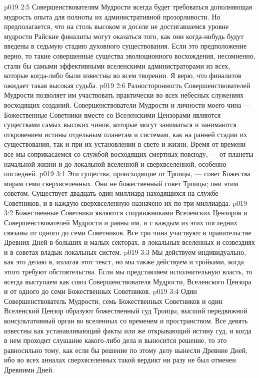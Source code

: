 \vs p019 2:5 Совершенствователям Мудрости всегда будет требоваться дополняющая мудрость опыта для полноты их административной прозорливости. Но предполагается, что на столь высоком и доселе не достигавшемся уровне мудрости Райские финалиты могут оказаться  того, как они когда\hyp{}нибудь будут введены в седьмую стадию духовного существования. Если это предположение верно, то такие совершенные существа эволюционного восхождения, несомненно, стали бы самыми эффективными вселенскими администраторами из всех, которые когда\hyp{}либо были известны во всем творении. Я верю, что финалитов ожидает такая высокая судьба.
\vs p019 2:6 \pc Разносторонность Совершенствователей Мудрости позволяет им участвовать практически во всех небесных служениях восходящих созданий. Совершенствователи Мудрости и личности моего чина --- Божественные Советники вместе со Вселенскими Цензорами являются существами самых высоких чинов, которые могут заниматься и занимаются откровением истины отдельным планетам и системам, как на ранней стадии их существования, так и при их установлении в свете и жизни. Время от времени все мы соприкасаемся со службой восходящих смертных повсюду, --- от планеты начальной жизни и до локальной вселенной и сверхвселенной, особенно последней.
\vs p019 3:1 Эти существа, происходящие от Троицы, --- совет Божества мирам семи сверхвселенных. Они не  божественный совет Троицы; они  этим советом. Существует двадцать один миллиард находящихся на службе Советников, и в каждую сверхвселенную назначено их по три миллиарда.
\vs p019 3:2 Божественные Советники являются сподвижниками Вселенских Цензоров и Совершенствователей Мудрости и равны им, и с каждым из этих последних связаны от одного до семи Советников. Все три чина участвуют в правительстве Древних Дней в больших и малых секторах, в локальных вселенных и созвездиях и в советах владык локальных систем.
\vs p019 3:3 Мы действуем индивидуально, как это делаю я, излагая этот текст, но мы также действуем и тройками, когда этого требуют обстоятельства. Если мы представляем исполнительную власть, то всегда выступаем как союз Совершенствователя Мудрости, Вселенского Цензора и от одного до семи Божественных Советников.
\vs p019 3:4 \pc Один Совершенствователь Мудрости, семь Божественных Советников и один Вселенский Цензор образуют божественный суд Троицы, высший передвижной консультативный орган во вселенных со временем и пространством. Все девять известны как устанавливающий факты или же открывающий истину суд, и когда в нем проходит слушание какого\hyp{}либо дела и выносится решение, то это равносильно тому, как если бы решение по этому делу вынесли Древние Дней, ибо во всех анналах сверхвселенных такой вердикт ни разу не был отменен Древними Дней.
